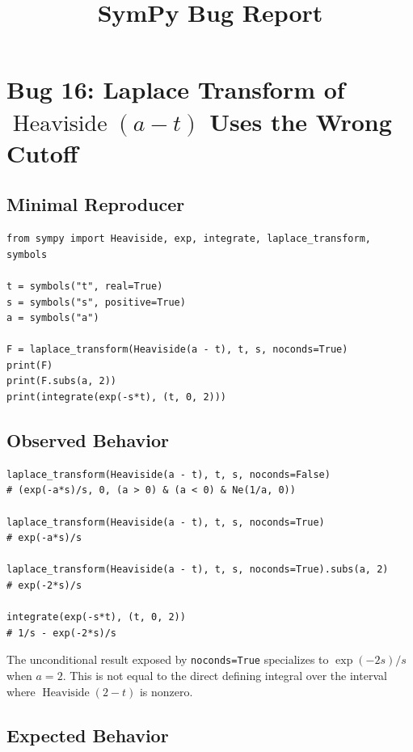 \documentclass[11pt]{article}
\title{SymPy Bug Report}
\author{}
\date{}
\begin{document}
\maketitle

\section{Bug 16: Laplace Transform of \texorpdfstring{$\operatorname{Heaviside}(a-t)$}{Heaviside(a - t)} Uses the Wrong Cutoff}

\subsection{Minimal Reproducer}

\medskip

\begin{lstlisting}[style=bugpython]
from sympy import Heaviside, exp, integrate, laplace_transform, symbols

t = symbols("t", real=True)
s = symbols("s", positive=True)
a = symbols("a")

F = laplace_transform(Heaviside(a - t), t, s, noconds=True)
print(F)
print(F.subs(a, 2))
print(integrate(exp(-s*t), (t, 0, 2)))
\end{lstlisting}

\subsection{Observed Behavior}

\medskip

\begin{lstlisting}[style=bugpython]
laplace_transform(Heaviside(a - t), t, s, noconds=False)
# (exp(-a*s)/s, 0, (a > 0) & (a < 0) & Ne(1/a, 0))

laplace_transform(Heaviside(a - t), t, s, noconds=True)
# exp(-a*s)/s

laplace_transform(Heaviside(a - t), t, s, noconds=True).subs(a, 2)
# exp(-2*s)/s

integrate(exp(-s*t), (t, 0, 2))
# 1/s - exp(-2*s)/s
\end{lstlisting}

The unconditional result exposed by \texttt{noconds=True} specializes to
\(\exp(-2s)/s\) when \(a=2\).  This is not equal to the direct defining
integral over the interval where \(\operatorname{Heaviside}(2-t)\) is nonzero.

\subsection{Expected Behavior}
\end{document}
